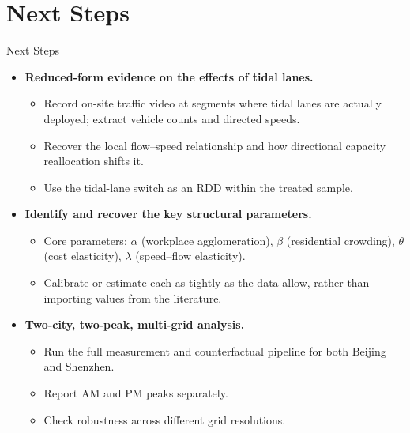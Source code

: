 \documentclass[11pt,aspectratio=169]{beamer}
\newcommand{\good}[1]{\textcolor{blue!70!black}{#1}}
\newcommand{\app}[1]{\allowbreak\hspace{0.25em}\hyperlink{#1}{\beamergotobutton{details}}}
\begin{document}
\section{Next Steps}
\begin{frame}[label=nextsteps]{Next Steps}
\small
\begin{itemize}
  \item \textbf{Reduced-form evidence on the effects of tidal lanes.}
  \begin{itemize}\footnotesize
    \item Record on-site traffic video at segments where tidal lanes are actually deployed; extract vehicle counts and directed speeds.
    \item Recover the local flow--speed relationship and how directional capacity reallocation shifts it.
    \item Use the tidal-lane switch as an \good{RDD} within the treated sample. \app{appfieldvisit}
  \end{itemize}
  \item \textbf{Identify and recover the key structural parameters.}
  \begin{itemize}\footnotesize
    \item Core parameters: $\alpha$ (workplace agglomeration), $\beta$ (residential crowding), $\theta$ (cost elasticity), $\lambda$ (speed--flow elasticity).
    \item Calibrate or estimate each as tightly as the data allow, rather than importing values from the literature.
  \end{itemize}
  \item \textbf{Two-city, two-peak, multi-grid analysis.}
  \begin{itemize}\footnotesize
    \item Run the full measurement and counterfactual pipeline for both \good{Beijing} and \good{Shenzhen}.
    \item Report \good{AM} and \good{PM} peaks separately.
    \item Check robustness across different grid resolutions.
  \end{itemize}
\end{itemize}
\end{frame}

\appendix
\end{document}
